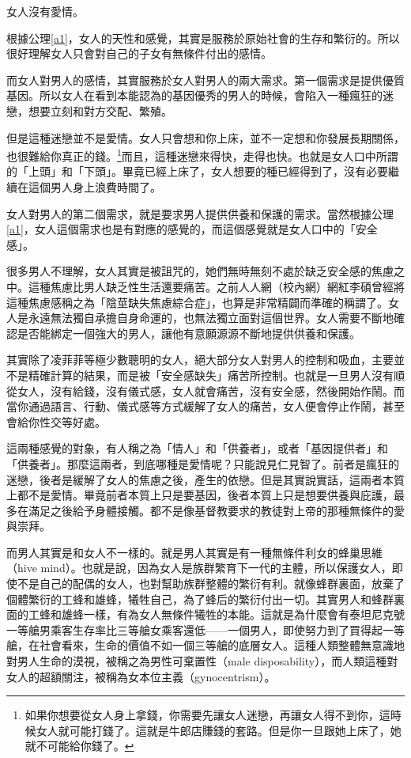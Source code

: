 \begin{corollary}\label{c2}
女人沒有愛情。
\end{corollary}

根據公理\ref{a1}，女人的天性和感覺，其實是服務於原始社會的生存和繁衍的。所以很好理解女人只會對自己的子女有無條件付出的感情。

而女人對男人的感情，其實服務於女人對男人的兩大需求。第一個需求是提供優質基因。所以女人在看到本能認為的基因優秀的男人的時候，會陷入一種瘋狂的迷戀，想要立刻和對方交配、繁殖。

但是這種迷戀並不是愛情。女人只會想和你上床，並不一定想和你發展長期關係，也很難給你真正的錢。\footnote{如果你想要從女人身上拿錢，你需要先讓女人迷戀，再讓女人得不到你，這時候女人就可能打錢了。這就是牛郎店賺錢的套路。但是你一旦跟她上床了，她就不可能給你錢了。}而且，這種迷戀來得快，走得也快。也就是女人口中所謂的「上頭」和「下頭」。畢竟已經上床了，女人想要的種已經得到了，沒有必要繼續在這個男人身上浪費時間了。

女人對男人的第二個需求，就是要求男人提供供養和保護的需求。當然根據公理\ref{a1}，女人這個需求也是有對應的感覺的，而這個感覺就是女人口中的「安全感」。

很多男人不理解，女人其實是被詛咒的，她們無時無刻不處於缺乏安全感的焦慮之中。這種焦慮比男人缺乏性生活還要痛苦。之前人人網（校內網）網紅李碩曾經將這種焦慮感稱之為「陰莖缺失焦慮綜合症」，也算是非常精闢而準確的稱謂了。女人是永遠無法獨自承擔自身命運的，也無法獨立面對這個世界。女人需要不斷地確認是否能綁定一個強大的男人，讓他有意願源源不斷地提供供養和保護。

其實除了凌菲菲等極少數聰明的女人，絕大部分女人對男人的控制和吸血，主要並不是精確計算的結果，而是被「安全感缺失」痛苦所控制。也就是一旦男人沒有順從女人，沒有給錢，沒有儀式感，女人就會痛苦，沒有安全感，然後開始作鬧。而當你通過語言、行動、儀式感等方式緩解了女人的痛苦，女人便會停止作鬧，甚至會給你性交等好處。

這兩種感覺的對象，有人稱之為「情人」和「供養者」，或者「基因提供者」和「供養者」。那麼這兩者，到底哪種是愛情呢？只能說見仁見智了。前者是瘋狂的迷戀，後者是緩解了女人的焦慮之後，產生的依戀。但是其實說實話，這兩者本質上都不是愛情。畢竟前者本質上只是要基因，後者本質上只是想要供養與庇護，最多在滿足之後給予身體接觸。都不是像基督教要求的教徒對上帝的那種無條件的愛與崇拜。

而男人其實是和女人不一樣的。就是男人其實是有一種無條件利女的蜂巢思維（hive mind）。也就是說，因為女人是族群繁育下一代的主體，所以保護女人，即使不是自己的配偶的女人，也對幫助族群整體的繁衍有利。就像蜂群裏面，放棄了個體繁衍的工蜂和雄蜂，犧牲自己，為了蜂后的繁衍付出一切。其實男人和蜂群裏面的工蜂和雄蜂一樣，有為女人無條件犧牲的本能。這就是為什麼會有泰坦尼克號一等艙男乘客生存率比三等艙女乘客還低——一個男人，即使努力到了買得起一等艙，在社會看來，生命的價值不如一個三等艙的底層女人。這種人類整體無意識地對男人生命的漠視，被稱之為男性可棄置性（male disposability），而人類這種對女人的超額關注，被稱為女本位主義（gynocentrism）。

